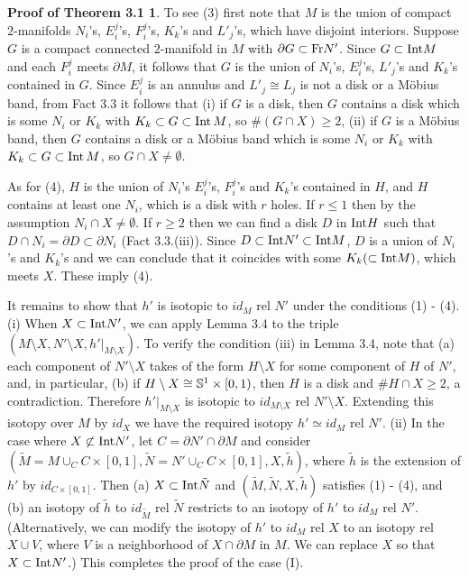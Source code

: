 \documentclass[11pt]{amsart}
\theoremstyle{definition}
\newtheorem*{Proof of Theorem 3.1}{Proof of Theorem 3.1}
\newtheorem*{Proof of Corollary 3.1}{Proof of Corollary 3.1}
\newtheorem*{Proof of Proposition 4.1.(1)}{Proof of Proposition 4.1.(1)}
\newtheorem*{Proof of Proposition 4.1.(2)}{Proof of Proposition 4.1.(2)}
\newtheorem*{Proof of Corollary 1.1}{Proof of Corollary 1.1}
\begin{document}
\begin{Proof of Theorem 3.1}
To see (3) first note that $M$ is the union of compact $2$-manifolds $N_i$'s, $E^j_i$'s, $F^j_i$'s, $K_k$'s and $L'_j$'s, which have disjoint interiors. Suppose $G$ is a compact connected $2$-manifold in $M$ with $\partial G \subset {\rm Fr} N'$. Since $G \subset {\rm Int} M$ and each $F^j_i$ meets $\partial M$, it follows that $G$ is the union of $N_i$'s, $E^j_i$'s, $L'_j$'s and $K_k$'s contained in $G$. Since $E^j_i$ is an annulus and $L'_j \cong L_j$ is not a disk or a M\"obius band, from Fact 3.3 it follows that
(i) if $G$ is a disk, then $G$ contains a disk which is some $N_i$ or $K_k$ with $K_k \subset G \subset {\rm Int}\, M$, so $\#(G \cap X) \geq 2$, 
(ii) if $G$ is a M\"obius band, then $G$ contains a disk or a M\"obius band which is some $N_i$ or $K_k$ with $K_k \subset G \subset {\rm Int}\, M$, so $G \cap X \neq \emptyset$.

As for (4), $H$ is the union of $N_i$'s $E^j_i$'s, $F^j_i$'s and $K_k$'s contained in $H$, and $H$ contains at least one $N_i$, which is a disk with $r$ holes. If $r \leq 1$ then by the assumption $N_i \cap X \neq \emptyset$. If $r \geq 2$ then we can find a disk $D$ in ${\rm Int} H$ such that $D \cap N_i = \partial D \subset \partial N_i$ (Fact 3.3.(iii)). 
Since $D \subset {\rm Int} N' \subset {\rm Int} M$, $D$ is a union of $N_i$'s and $K_k$'s and we can conclude that it coincides with some $K_k (\subset {\rm Int} M)$, which meets $X$. These imply (4).

It remains to show that $h'$ is isotopic to $id_M$ rel $N'$ under the conditions (1) - (4). 
(i) When $X \subset {\rm Int}N'$, we can apply Lemma 3.4 to the triple $(M \setminus X, N' \setminus X, h'|_{M \setminus X})$. To verify the condition (iii) in Lemma 3.4, note that (a) each component of $N' \setminus X$ takes of the form $H \setminus X$ for some component of $H$ of $N'$, and, in particular, (b) if $H \setminus X \cong {\Bbb S}^1 \times [0, 1)$, then $H$ is a disk and $\#H \cap X \geq 2$, a contradiction. Therefore $h'|_{M \setminus X}$ is isotopic to $id_{M \setminus X}$ rel $N' \setminus X$. Extending this isotopy over $M$ by $id_X$ we have the required isotopy $h' \simeq id_M$ rel $N'$.
(ii) In the case where $X \not\subset {\rm Int} N'$, let $C = \partial N' \cap \partial M$ and consider $(\tilde{M} = M \cup_C C \times [0, 1], \tilde{N} = N' \cup_C C \times [0, 1], X, \tilde{h})$, where $\tilde{h}$ is the extension of $h'$ by $id_{C \times [0,1]}$. Then (a) $X \subset {\rm Int} \tilde{N}$ and $(\tilde{M}, \tilde{N}, X, \tilde{h})$ satisfies (1) - (4), and (b) an isotopy of $\tilde{h}$ to $id_{\tilde{M}}$ rel $\tilde{N}$ restricts to an isotopy of $h'$ to $id_M$ rel $N'$. (Alternatively, we can modify the isotopy of $h'$ to $id_M$ rel $X$ to an isotopy rel $X \cup V$, where $V$ is a neighborhood of $X \cap \partial M$ in $M$. We can replace $X$ so that $X \subset {\rm Int} N'$.) This completes the proof of the case (I).


\end{Proof of Theorem 3.1}
\end{document}
